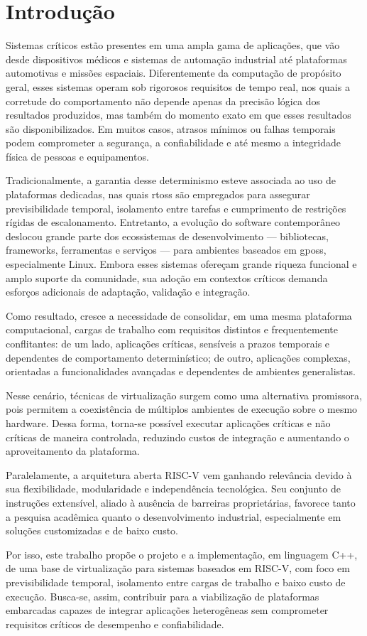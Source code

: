 \chapter{Introdução}

Sistemas críticos estão presentes em uma ampla gama de aplicações, que vão desde dispositivos médicos e sistemas de automação industrial
até plataformas automotivas e missões espaciais. Diferentemente da computação de propósito geral, esses sistemas operam sob rigorosos requisitos
de tempo real, nos quais a corretude do comportamento não depende apenas da precisão lógica dos resultados produzidos, mas também do momento
exato em que esses resultados são disponibilizados. Em muitos casos, atrasos mínimos ou falhas temporais podem comprometer a segurança, a
confiabilidade e até mesmo a integridade física de pessoas e equipamentos.

Tradicionalmente, a garantia desse determinismo esteve associada ao uso de plataformas dedicadas, nas quais \glspl{rtos} são empregados para assegurar
previsibilidade temporal, isolamento entre tarefas e cumprimento de restrições rígidas de escalonamento. Entretanto, a evolução do software contemporâneo
deslocou grande parte dos ecossistemas de desenvolvimento — bibliotecas, frameworks, ferramentas e serviços — para ambientes baseados em \glspl{gpos},
especialmente Linux. Embora esses sistemas ofereçam grande riqueza funcional e amplo suporte da comunidade, sua adoção em contextos críticos demanda
esforços adicionais de adaptação, validação e integração.

Como resultado, cresce a necessidade de consolidar, em uma mesma plataforma computacional, cargas de trabalho com requisitos distintos e frequentemente
conflitantes: de um lado, aplicações críticas, sensíveis a prazos temporais e dependentes de comportamento determinístico; de outro, aplicações complexas,
orientadas a funcionalidades avançadas e dependentes de ambientes generalistas.

Nesse cenário, técnicas de virtualização surgem como uma alternativa promissora, pois permitem a coexistência de múltiplos ambientes de execução sobre o
mesmo hardware. Dessa forma, torna-se possível executar aplicações críticas e não críticas de maneira controlada, reduzindo custos de integração e
aumentando o aproveitamento da plataforma.

Paralelamente, a arquitetura aberta RISC-V vem ganhando relevância  devido à sua flexibilidade, modularidade e independência
tecnológica. Seu conjunto de instruções extensível, aliado à ausência de barreiras proprietárias, favorece tanto a pesquisa acadêmica quanto o desenvolvimento
industrial, especialmente em soluções customizadas e de baixo custo.

Por isso, este trabalho propõe o projeto e a implementação, em linguagem C++, de uma base de virtualização para sistemas baseados
em RISC-V, com foco em previsibilidade temporal, isolamento entre cargas de trabalho e baixo custo de execução. Busca-se, assim, contribuir para
a viabilização de plataformas embarcadas capazes de integrar aplicações heterogêneas sem comprometer requisitos críticos de desempenho
e confiabilidade.
